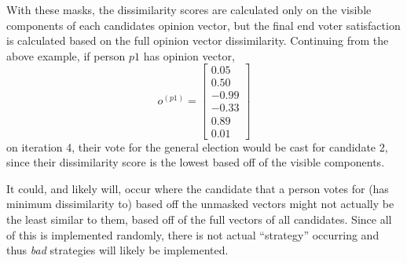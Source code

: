 With these masks, the dissimilarity scores are calculated only on the visible components of each candidates opinion vector, but the final end voter satisfaction is calculated based on the full opinion vector dissimilarity.
Continuing from the above example, if person $p1$ has opinion vector, $$o^{(p1)}=\begin{bmatrix}0.05\\0.50\\-0.99\\-0.33\\0.89\\0.01\end{bmatrix}$$  on iteration 4, their vote for the general election would be cast for candidate 2, since their dissimilarity score is the lowest based off of the visible components.

It could, and likely will, occur where the candidate that a person votes for (has minimum dissimilarity to) based off the unmasked vectors might not actually be the least similar to them, based off of the full vectors of all candidates.
Since all of this is implemented randomly, there is not actual ``strategy'' occurring and thus {\it bad} strategies will likely be implemented.
